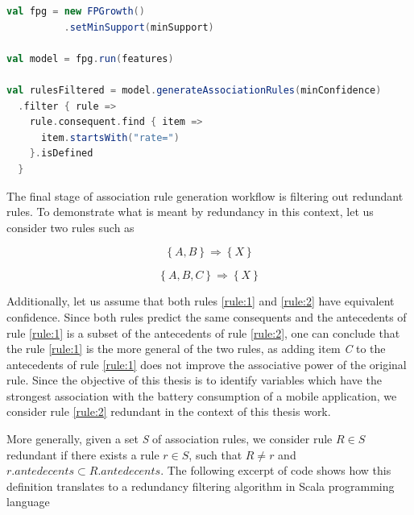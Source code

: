 \begin{minipage}{0.95\linewidth}
\begin{lstlisting}[language=scala] 
val fpg = new FPGrowth()
		  .setMinSupport(minSupport)
			  
val model = fpg.run(features)

val rulesFiltered = model.generateAssociationRules(minConfidence)
  .filter { rule =>
    rule.consequent.find { item =>
	  item.startsWith("rate=")
	}.isDefined
  }
\end{lstlisting}
\end{minipage}       

The final stage of association rule generation workflow is filtering out redundant rules. To demonstrate what is meant by redundancy in this context, let us consider two rules such as    

\begin{equation}
	\left\{ A, B \right\}  \Rightarrow  \left\{ X \right\} \label{rule:1}
\end{equation}

\begin{equation}
\left\{ A, B, C \right\}  \Rightarrow  \left\{ X \right\} \label{rule:2}
\end{equation}

Additionally, let us assume that both rules \eqref{rule:1} and \eqref{rule:2} have equivalent confidence. Since both rules predict the same consequents and the antecedents of rule \eqref{rule:1} is a subset of the antecedents of rule \eqref{rule:2}, one can conclude that the rule \eqref{rule:1} is the more general of the two rules, as adding item \textit{C} to the antecedents of rule \eqref{rule:1} does not improve the associative power of the original rule. Since the objective of this thesis is to identify variables which have the strongest association with the battery consumption of a mobile application, we consider rule \eqref{rule:2} redundant in the context of this thesis work.

More generally, given a set \textit{S} of association rules, we consider rule $R \in S$ redundant if there exists a rule $r \in S$, such that $R \neq r$ and $r.antedecents \subset R.antedecents$. The following excerpt of code shows how this definition translates to a redundancy filtering algorithm in Scala programming language
    
